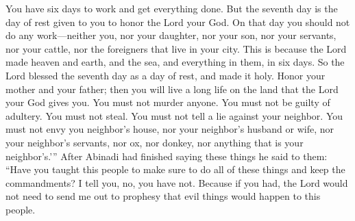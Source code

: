 You have six days to work and get everything done.
\bverse \iffalse But the seventh day, the sabbath of the Lord thy God, thou shalt not do any work, thou, nor thy son, nor thy daughter, thy man-servant, nor thy maid-servant, nor thy cattle, nor thy stranger that is within thy gates; \fi
But the seventh day is the day of rest given to you to honor the Lord your God. On that day you should not do any work---neither you, nor your daughter, nor your son, nor your servants, nor your cattle, nor the foreigners that live in your city.
\bverse \iffalse For in six days the Lord made heaven and earth, and the sea, and all that in them is; wherefore the Lord blessed the sabbath day, and hallowed it. \fi
This is because the Lord made heaven and earth, and the sea, and everything in them, in six days. So the Lord blessed the seventh day as a day of rest, and made it holy.
\bverse \iffalse Honor thy father and thy mother, that thy days may be long upon the land which the Lord thy God giveth thee. \fi
Honor your mother and your father; then you will live a long life on the land that the Lord your God gives you.
\bverse \iffalse Thou shalt not kill. \fi
You must not murder anyone.
\bverse \iffalse Thou shalt not commit adultery. Thou shalt not steal. \fi
You must not be guilty of adultery. You must not steal.
\bverse \iffalse Thou shalt not bear false witness against thy neighbor. \fi
You must not tell a lie against your neighbor.
\bverse \iffalse Thou shalt not covet thy neighbor's house, thou shalt not covet thy neighbor's wife, nor his man-servant, nor his maid-servant, nor his ox, nor his ass, nor anything that is thy neighbor's. \fi
You must not envy you neighbor's house, nor your neighbor's husband or wife, nor your neighbor's servants, nor ox, nor donkey, nor anything that is your neighbor's.\rq ''
\bverse \iffalse And it came to pass that after Abinadi had made an end of these sayings that he said unto them: Have ye taught this people that they should observe to do all these things for to keep these commandments? \fi
After Abinadi had finished saying these things he said to them: ``Have you taught this people to make sure to do all of these things and keep the commandments?
\bverse \iffalse I say unto you, Nay; for if ye had, the Lord would not have caused me to come forth and to prophesy evil concerning this people. \fi
I tell you, no, you have not. Because if you had, the Lord would not need to send me out to prophesy that evil things would happen to this people.
